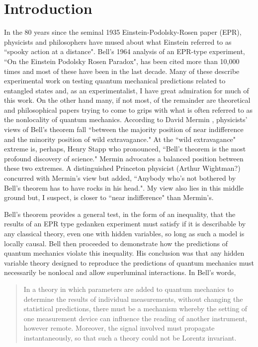 \documentclass[12pt]{article}
\begin{document}
\section{Introduction}\label{INTRO}

In the 80 years since the seminal 1935 Einstein-Podolsky-Rosen paper (EPR)\cite{EPR35}, physicists and philosophers have mused about what Einstein referred to as ``spooky action at a distance". Bell's 1964 analysis of an EPR-type experiment, ``On the Einstein Podolsky Rosen Paradox"\cite{Bel64}, has been cited more than 10,000 times and most of these have been in the last decade. Many of these describe experimental work on testing quantum mechanical predictions related to entangled states and, as an experimentalist, I have great admiration for much of this work. On the other hand many, if not most, of the remainder are theoretical and philosophical papers trying to come to grips with what is often referred to as the nonlocality of quantum mechanics. According to David Mermin \cite{Mer85}, physicists' views of Bell's theorem fall ``between the majority position of near indifference and the minority position of wild extravagance." At the ``wild extravagance" extreme is, perhaps, Henry Stapp  who pronounced, ``Bell's theorem is the most profound discovery of science."\cite{Sta75}  Mermin advocates a balanced position between these two extremes. A distinguished Princeton physicist (Arthur Wightman?) concurred with Mermin's view but added, ``Anybody who's not bothered by Bell's theorem has to have rocks in his head."\cite{Mer85}. My view also lies in this middle ground but, I suspect, is closer to ``near indifference" than Mermin's.

Bell's theorem provides a general test, in the form of an inequality, that the results of an EPR type gedanken experiment must satisfy if it is describable by any classical theory, even one with hidden variables, so long as such a model is locally causal. Bell then proceeded to demonstrate how the predictions of quantum mechanics violate this inequality. His conclusion was that any hidden variable theory designed to reproduce the predictions of quantum mechanics must necessarily be nonlocal and allow superluminal interactions. In Bell's words\cite{Bel64},
\begin{quote}
In a theory in which parameters are added to quantum mechanics to determine the results of individual measurements, without changing the statistical predictions, there must be a mechanism whereby the setting of one measurement device can influence the reading of another instrument, however remote. Moreover, the signal involved must propagate instantaneously, so that such a theory could not be Lorentz invariant.
\end{quote}
\end{document}
